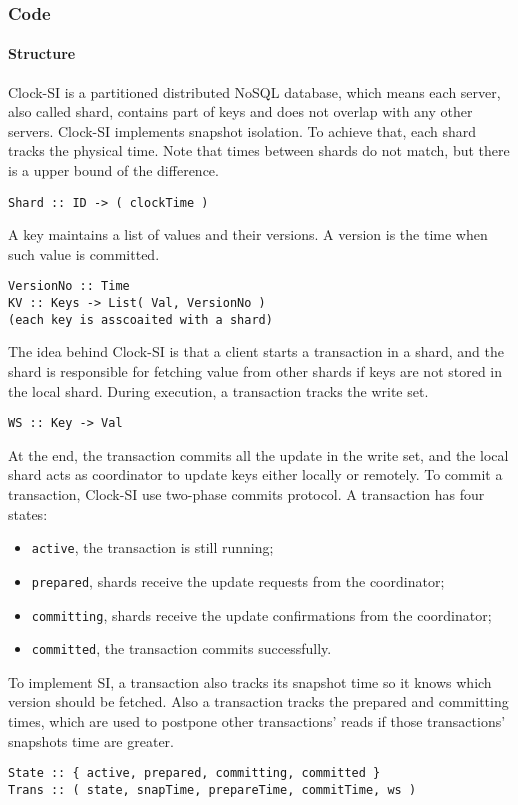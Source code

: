 \subsubsection{Code}

\paragraph{\bf Structure}
Clock-SI is a partitioned distributed NoSQL database, which means 
each server, also called shard, contains part of keys and does not overlap with any other servers.
Clock-SI implements snapshot isolation.
To achieve that, each shard tracks the physical time.
Note that times between shards do not match,
but there is a upper bound of the difference.
\begin{lstlisting}[caption={Shard},label={lst:clock-si-shard}]
Shard :: ID -> ( clockTime )
\end{lstlisting}
A key maintains a list of values and their versions.
A version is the time when such value is committed.
\begin{lstlisting}[caption={Key-value store},label={lst:clock-si-key-value-store}]
VersionNo :: Time
KV :: Keys -> List( Val, VersionNo )
(each key is asscoaited with a shard)
\end{lstlisting}
The idea behind Clock-SI is that
a client starts a transaction in a shard, 
and the shard is responsible for fetching value from other shards
if keys are not stored in the local shard.
During execution, a transaction tracks the write set.
\begin{lstlisting}[caption={Write set},label={lst:clock-si-write-set}]
WS :: Key -> Val
\end{lstlisting}
At the end, the transaction commits all the update in the write set,
and the local shard acts as coordinator to update keys either locally or remotely.
To commit a transaction, Clock-SI use two-phase commits protocol.
A transaction has four states:
\begin{itemize}
    \item \verb|active|, the transaction is still running;
    \item \verb|prepared|, shards receive the update requests from the coordinator;
    \item \verb|committing|, shards receive the update confirmations from the coordinator;
    \item \verb|committed|, the transaction commits successfully.
\end{itemize}
To implement SI, a transaction also tracks its snapshot time 
so it knows which version should be fetched.
Also a transaction tracks the prepared and committing times,
which are used to postpone other transactions' reads 
if those transactions' snapshots time are greater.
\begin{lstlisting}[caption={Transaction runtime},label={lst:clock-si-trans-runtime}]
State :: { active, prepared, committing, committed }
Trans :: ( state, snapTime, prepareTime, commitTime, ws )
\end{lstlisting}

